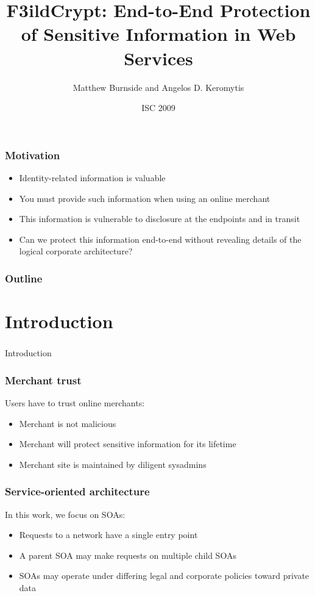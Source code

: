 \documentclass{beamer}
\title[F3ildCrypt]{F3ildCrypt: End-to-End Protection of Sensitive Information
in Web Services}
\author[Burnside, Keromytis]{Matthew Burnside and Angelos D. Keromytis}
\institute[Columbia University]{
Department of Computer Science\\
Columbia University\\
\texttt{\{mb, angelos\}@cs.columbia.edu}
}
\date{ISC 2009}
\begin{document}
\begin{frame}[plain]
    \titlepage
\end{frame}

\begin{frame}
\frametitle{Motivation}
\begin{itemize}
\item Identity-related information is valuable
\item You must provide such information when using an online merchant
\item This information is vulnerable to disclosure at the endpoints and in
transit 
\item Can we protect this information end-to-end without revealing details of
the logical corporate architecture?
\end{itemize}
\end{frame}

\begin{frame}
\frametitle{Outline}
\tableofcontents
\end{frame}

\section{Introduction}
\begin{frame}
\frametitle{}
\begin{center}
Introduction
\end{center}
\end{frame}

\begin{frame}
\frametitle{Merchant trust}
Users have to trust online merchants:
\smallskip
\begin{itemize}
\item Merchant is not malicious
\item Merchant will protect sensitive information for its lifetime
\item Merchant site is maintained by diligent sysadmins
\end{itemize}
\end{frame}

\begin{frame}
\frametitle{Service-oriented architecture}
In this work, we focus on SOAs:
\smallskip
\begin{itemize}
\item Requests to a network have a single entry point
\item A parent SOA may make requests on multiple child SOAs 
\item SOAs may operate under differing legal and corporate policies toward
private data
\end{itemize}
\end{frame}
\end{document}
